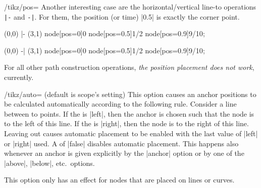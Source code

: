 \begin{key}{/tikz/pos=}
    Another interesting case are the horizontal/vertical line-to operations
    \verb!|-! and \verb!-|!. For them, the position (or time) |0.5| is exactly
    the corner point.
\begin{codeexample}[]
\tikz \draw (0,0) |- (3,1)
  node[pos=0]{0} node[pos=0.5]{1/2} node[pos=0.9]{9/10};
\end{codeexample}

\begin{codeexample}[]
\tikz \draw (0,0) -| (3,1)
  node[pos=0]{0} node[pos=0.5]{1/2} node[pos=0.9]{9/10};
\end{codeexample}

    For all other path construction operations, \emph{the position placement
    does not work}, currently.
\end{key}

\begin{key}{/tikz/auto= (default \normalfont is scope's setting)}
    This option causes an anchor positions to be calculated automatically
    according to the following rule. Consider a line between to points. If the
     is |left|, then the anchor is chosen such that the node is
    to the left of this line. If the  is |right|, then the node
    is to the right of this line. Leaving out  causes automatic
    placement to be enabled with the last value of |left| or |right| used. A
     of |false| disables automatic placement. This happens also
    whenever an anchor is given explicitly by the |anchor| option or by one of
    the |above|, |below|, etc.\ options.

    This option only has an effect for nodes that are placed on lines or
    curves.
\begin{codeexample}[]
\end{codeexample}
\end{key}

